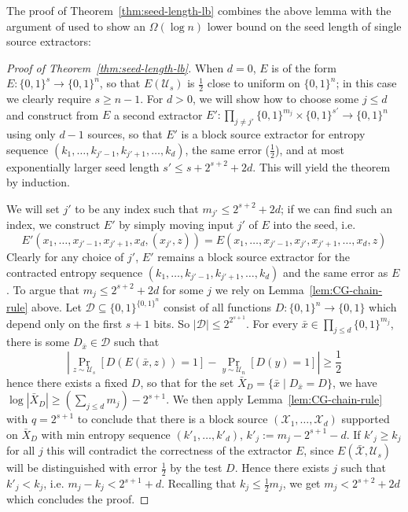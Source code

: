 \documentclass[11pt]{article}
\newcommand{\B}{\{0,1\}}
\begin{document}
The proof of Theorem~\ref{thm:seed-length-lb} combines the above lemma with the argument of \cite{NZ} used to show an $\Omega(\log n)$ lower bound on the seed length of single source extractors:
\begin{proof}[Proof of Theorem~\ref{thm:seed-length-lb}]
When $d = 0$, $E$ is of the form $E: \B^s \to \B^n$, so that $E(\mathcal{U}_s)$ is $\frac{1}{2}$ close to uniform on $\B^n$; in this case we clearly require $s \geq n-1$. For $d> 0$, we will show how to choose some $j \leq d$ and construct from $E$ a second extractor $E':\prod_{j \neq j'} \B^{m_j} \times \B^{s'} \to \B^n$ using only $d-1$ sources, so that $E'$ is a block source extractor for entropy sequence $(k_1,\ldots,k_{j'-1},k_{j'+1},\ldots,k_d)$, the same error ($\frac{1}{2}$), and at most exponentially larger seed length $s' \leq s + 2^{s+2} + 2d$. This will yield the theorem by induction.

We will set $j'$ to be any index such that $m_{j'}\leq 2^{s+2}+ 2d$; if we can find such an index, we construct $E'$ by simply moving input $j'$ of $E$ into the seed, i.e.
\[
E'(x_1,\ldots,x_{j'-1}, x_{j'+1}, x_d, (x_{j'},z)) = E(x_1,\ldots,x_{j'-1},x_{j'},x_{j'+1},\ldots,x_d,z)
\]
Clearly for any choice of $j'$, $E'$ remains a block source extractor for the contracted entropy sequence $(k_1,\ldots,k_{j'-1},k_{j'+1},\ldots,k_d)$ and the same error as $E$.
To argue that $m_j \leq 2^{s+2} + 2d$ for some $j$ we rely on Lemma~\ref{lem:CG-chain-rule} above. Let $\mathcal{D} \subseteq \B^{\B^n}$ consist of all functions $D: \B^n \to \B$ which depend only on the first $s+1$ bits. So $|\mathcal{D}| \leq 2^{2^{s+1}}$. For every $\bar{x} \in \prod_{j \leq d} \B^{m_j}$, there is some $D_{\bar{x}} \in \mathcal{D}$ such that 
\[
|\Pr_{z \sim \mathcal{U}_s} [D(E(\bar{x},z)) = 1] - \Pr_{y \sim \mathcal{U}_n} [D(y) = 1] | \geq \frac{1}{2}
\] 
hence there exists a fixed $D$, so that for the set $\bar{X}_D = \{\bar{x} \mid D_{\bar{x}}=D\}$, 
we have $\log |\bar{X}_D| \geq (\sum_{j\leq d} m_j) - 2^{s+1}$. We then apply Lemma~\ref{lem:CG-chain-rule} with $q = 2^{s+1}$ to conclude that there is a block source $(\mathcal{X}_1,\ldots,\mathcal{X}_d)$ supported on $\bar{X}_D$ with min entropy sequence $(k'_1,\ldots,k'_d)$, $k'_j := m_j - 2^{s+1} - d$. If $k'_j \geq k_j$ for all $j$ this will contradict the correctness of the extractor $E$, since $E(\bar{\mathcal{X}}, \mathcal{U}_s)$ will be distinguished with error $\frac{1}{2}$ by the test $D$. Hence there exists $j$ such that $k'_j < k_j$, i.e. $m_j - k_j < 2^{s+1} + d$. Recalling that $k_j \leq \frac{1}{2}m_j$, we get $m_j < 2^{s+2} + 2d$ which concludes the proof.
\end{proof}
\end{document}
